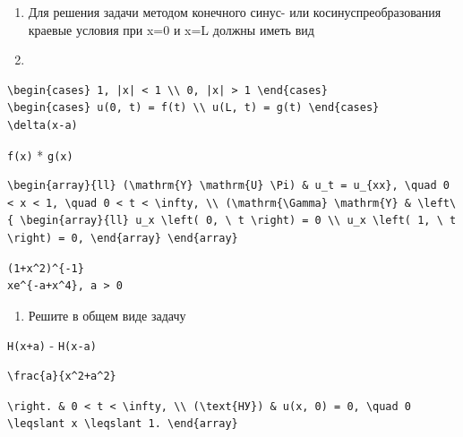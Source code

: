 \documentclass[
  ukrainian,
]{article}
\providecommand{\tightlist}{%
  \setlength{\itemsep}{0pt}\setlength{\parskip}{0pt}}
\begin{document}
\begin{enumerate}
\def\labelenumi{\arabic{enumi}.}
\item
  Для решения задачи методом конечного синус- или косинуспреобразования
  краевые условия при x=0 и x=L должны иметь вид
\item
\end{enumerate}

\begin{verbatim}
\begin{cases} 1, |x| < 1 \\ 0, |x| > 1 \end{cases}
\begin{cases} u(0, t) = f(t) \\ u(L, t) = g(t) \end{cases}
\delta(x-a)
\end{verbatim}

\texttt{f(x)} * \texttt{g(x)}

\begin{verbatim}
\begin{array}{ll} (\mathrm{Y} \mathrm{U} \Pi) & u_t = u_{xx}, \quad 0 < x < 1, \quad 0 < t < \infty, \\ (\mathrm{\Gamma} \mathrm{Y} & \left\{ \begin{array}{ll} u_x \left( 0, \ t \right) = 0 \\ u_x \left( 1, \ t \right) = 0, \end{array} \end{array}
\end{verbatim}

\begin{verbatim}
(1+x^2)^{-1}
xe^{-a+x^4}, a > 0
\end{verbatim}

\begin{enumerate}
\def\labelenumi{\arabic{enumi}.}
\setcounter{enumi}{1}
\tightlist
\item
  Решите в общем виде задачу
\end{enumerate}

\texttt{H(x+a)} - \texttt{H(x-a)}

\begin{verbatim}
\frac{a}{x^2+a^2}
\end{verbatim}

\begin{verbatim}
\right. & 0 < t < \infty, \\ (\text{НУ}) & u(x, 0) = 0, \quad 0 \leqslant x \leqslant 1. \end{array}
\end{verbatim}
\end{document}
